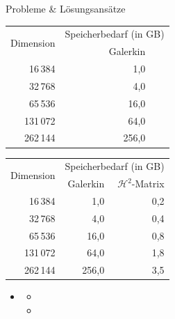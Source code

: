 \documentclass[10pt]{beamer}
\begin{document}
\begin{frame}{Probleme \& Lösungsansätze}
  \begin{overprint}
      \begin{table}[h]
        \begin{tabular}{rrr} \toprule
          \multirow{2}{*}{Dimension} & \multicolumn{2}{c}{Speicherbedarf (in 
          GB)} \\ \cmidrule{2-3}
                      & Galerkin & \\ \midrule
              16\,384 &      1,0 & \\
              32\,768 &      4,0 & \\
              65\,536 &     16,0 & \\
             131\,072 &     64,0 & \\
             262\,144 &    256,0 & \\ \bottomrule
        \end{tabular}
      \end{table}
      \begin{table}[h]
        \begin{tabular}{rrr} \toprule
          \multirow{2}{*}{Dimension} & \multicolumn{2}{c}{Speicherbedarf (in 
          GB)} \\ \cmidrule{2-3}
                      & Galerkin & \(\mathcal{H}^2\)-Matrix \\ \midrule
              16\,384 &      1,0 & 0,2 \\
              32\,768 &      4,0 & 0,4 \\
              65\,536 &     16,0 & 0,8 \\
             131\,072 &     64,0 & 1,8 \\
             262\,144 &    256,0 & 3,5 \\ \bottomrule
        \end{tabular}
      \end{table}
  \end{overprint}

  \begin{itemize}
    \item {}
    \begin{itemize}
      \item {}
      \item {}
    \end{itemize}
  \end{itemize}
\end{frame}
\end{document}
